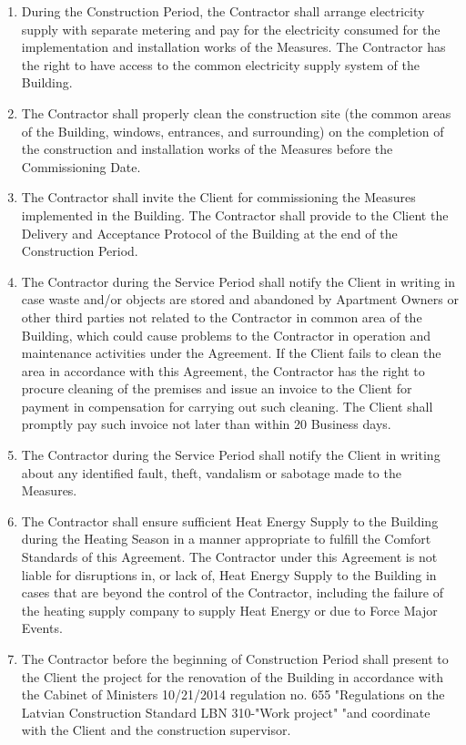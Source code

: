 \begin{multicols}{2}
\begin{enumerate}
	\item	During the Construction Period, the Contractor shall arrange electricity supply with separate metering and pay for the electricity consumed for the implementation and installation works of the Measures. The Contractor has the right to have access to the common electricity supply system of the Building.
	\item	The Contractor shall properly clean the construction site (the common areas of the Building, windows, entrances, and surrounding) on the completion of the construction and installation works of the Measures before the Commissioning Date.
	\item	The Contractor shall invite the Client for commissioning the Measures implemented in the Building. The Contractor shall provide to the Client the Delivery and Acceptance Protocol of the Building at the end of the Construction Period.
	\item	The Contractor during the Service Period shall notify the Client in writing in case waste and/or objects are stored and abandoned by Apartment Owners or other third parties not related to the Contractor in common area of the Building, which could cause problems to the Contractor in operation and maintenance activities under the Agreement. If the Client fails to clean the area in accordance with this Agreement, the Contractor has the right to procure cleaning of the premises and issue an invoice to the Client for payment in compensation for carrying out such cleaning. The Client shall promptly pay such invoice not later than within 20 Business days.
	\item	The Contractor during the Service Period shall notify the Client in writing about any identified fault, theft, vandalism or sabotage made to the Measures.
	\item	The Contractor shall ensure sufficient Heat Energy Supply to the Building during the Heating Season in a manner appropriate to fulfill the Comfort Standards of this Agreement. The Contractor under this Agreement is not liable for disruptions in, or lack of, Heat Energy Supply to the Building in cases that are beyond the control of the Contractor, including the failure of the heating supply company to supply Heat Energy or due to Force Major Events.
	\item	The Contractor before the beginning of Construction Period shall present to the Client the project for the renovation of the Building in accordance with the Cabinet of Ministers 10/21/2014 regulation no. 655 "Regulations on the Latvian Construction Standard LBN 310-"Work project" "and coordinate with the Client and the construction supervisor. %

\end{enumerate}
\end{multicols}
